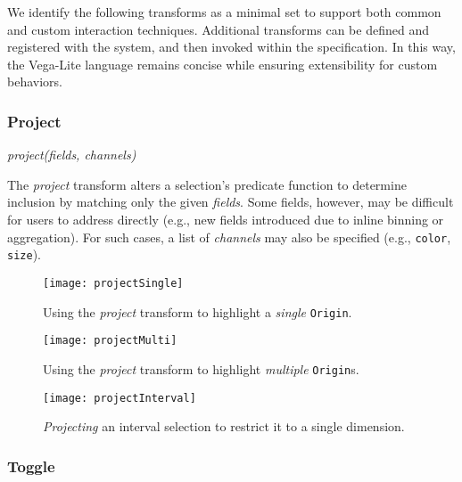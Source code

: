 We identify the following transforms as a minimal set to support both common and
custom interaction techniques. Additional transforms can be defined and
registered with the system, and then invoked within the specification. In this
way, the Vega-Lite language remains concise while ensuring extensibility for
custom behaviors.


\vspace{-10pt}

\subsubsection{Project}

\vspace{-7pt}

\centerline{\emph{project(fields, channels)}}

The \emph{project} transform alters a selection's predicate function to
determine inclusion by matching only the given \emph{fields}. Some fields,
however, may be difficult for users to address directly (e.g., new fields
introduced due to inline binning or aggregation). For such cases, a list of
\emph{channels} may also be specified (e.g., \texttt{color}, \texttt{size}).

\begin{figure}[h!]
  \centering
  \texttt{[image: projectSingle]}
  \caption{Using the \emph{project} transform to highlight a \emph{single}
  \texttt{Origin}.}
  \label{fig:vl:projectSingle}
\end{figure}

\begin{figure}[h!]
  \centering
  \texttt{[image: projectMulti]}
  \caption{Using the \emph{project} transform to highlight \emph{multiple}
  \texttt{Origin}s.}
  \label{fig:vl:projectMulti}
\end{figure}

\begin{figure}[h!]
  \centering
  \texttt{[image: projectInterval]}
  \caption{\emph{Projecting} an interval selection to restrict it to a
  single dimension.}
  \label{fig:vl:projectInterval}
\end{figure}

\subsubsection{Toggle}


